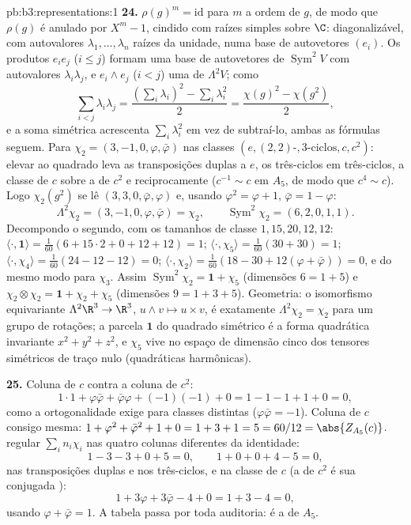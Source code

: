 \begin{solution}{pb:b3:representations:1}
\textbf{24.} $\rho(g)^m = \mathrm{id}$ para $m$ a ordem de
$g$, de modo que $\rho(g)$ é anulado por $X^m - 1$, cindido com
raízes simples sobre $\C$: diagonalizável, com autovalores
$\lambda_1, \dots, \lambda_n$ raízes da unidade, numa base de
autovetores $(e_i)$. Os produtos $e_ie_j$ ($i \leq j$) formam uma
base de autovetores de $\operatorname{Sym}^2V$ com autovalores
$\lambda_i\lambda_j$, e $e_i \wedge e_j$ ($i < j$) uma de
$\Lambda^2V$; como
\[
\sum_{i<j}\lambda_i\lambda_j
= \frac{(\sum_i\lambda_i)^2 - \sum_i\lambda_i^2}2
= \frac{\chi(g)^2 - \chi(g^2)}2,
\]
e a soma simétrica acrescenta $\sum_i\lambda_i^2$ em vez de
subtraí-lo, ambas as fórmulas seguem. Para $\chi_2 = (3, -1,
0, \varphi, \bar\varphi)$ nas classes $(e, (2,2)\text{-},
3\text{-ciclos}, c, c^2)$: elevar ao quadrado leva as transposições
duplas a $e$, os três-ciclos em três-ciclos, a
classe de $c$ sobre a de $c^2$ e reciprocamente ($c^{-1} \sim
c$ em $A_5$, de modo que $c^4 \sim c$). Logo $\chi_2(g^2)$ se lê $(3,
3, 0, \bar\varphi, \varphi)$ e, usando $\varphi^2 = \varphi
+ 1$, $\bar\varphi = 1 - \varphi$:
\[
\Lambda^2\chi_2 = (3, -1, 0, \varphi, \bar\varphi) = \chi_2,
\qquad
\operatorname{Sym}^2\chi_2 = (6, 2, 0, 1, 1) .
\]
Decompondo o segundo, com os tamanhos de classe $1, 15, 20, 12,
12$: $\langle\cdot, \mathbf 1\rangle = \frac1{60}(6 +
15\cdot2 + 0 + 12 + 12) = 1$; $\langle\cdot, \chi_5\rangle =
\frac1{60}(30 + 30) = 1$; $\langle\cdot, \chi_4\rangle =
\frac1{60}(24 - 12 - 12) = 0$; $\langle\cdot, \chi_2\rangle =
\frac1{60}(18 - 30 + 12(\varphi + \bar\varphi)) = 0$, e
do mesmo modo para $\chi_3$. Assim $\operatorname{Sym}^2\chi_2 =
\mathbf 1 + \chi_5$ (dimensões $6 = 1 + 5$) e
$\chi_2\otimes\chi_2 = \mathbf 1 + \chi_2 + \chi_5$
(dimensões $9 = 1 + 3 + 5$). Geometria: o isomorfismo
equivariante $\Lambda^2\R^3 \to \R^3$, $u \wedge v \mapsto u
\times v$, é exatamente $\Lambda^2\chi_2 = \chi_2$ para um
grupo de rotações; a parcela $\mathbf 1$ do quadrado
simétrico é a forma quadrática invariante $x^2 + y^2 + z^2$, e
$\chi_5$ vive no espaço de dimensão cinco dos tensores
simétricos de traço nulo (quadráticas harmônicas).

\textbf{25.} Coluna de $c$ contra a coluna de $c^2$:
\[
1\cdot1 + \varphi\bar\varphi + \bar\varphi\varphi +
(-1)(-1) + 0 = 1 - 1 - 1 + 1 + 0 = 0,
\]
como a ortogonalidade exige para classes distintas ($\varphi
\bar\varphi = -1$). Coluna de $c$ consigo mesma: $1 +
\varphi^2 + \bar\varphi^2 + 1 + 0 = 1 + 3 + 1 = 5 = 60/12 =
\abs{Z_{A_5}(c)}$.  regular $\sum_in_i\chi_i$ nas
quatro colunas diferentes da identidade:
\[
1 - 3 - 3 + 0 + 5 = 0, \qquad
1 + 0 + 0 + 4 - 5 = 0,
\]
nas transposições duplas e nos três-ciclos, e na classe
de $c$ (a de $c^2$ é sua conjugada ):
\[
1 + 3\varphi + 3\bar\varphi - 4 + 0 = 1 + 3 - 4 = 0,
\]
usando $\varphi + \bar\varphi = 1$. A tabela passa por toda
auditoria: é a  de $A_5$.
\end{solution}
